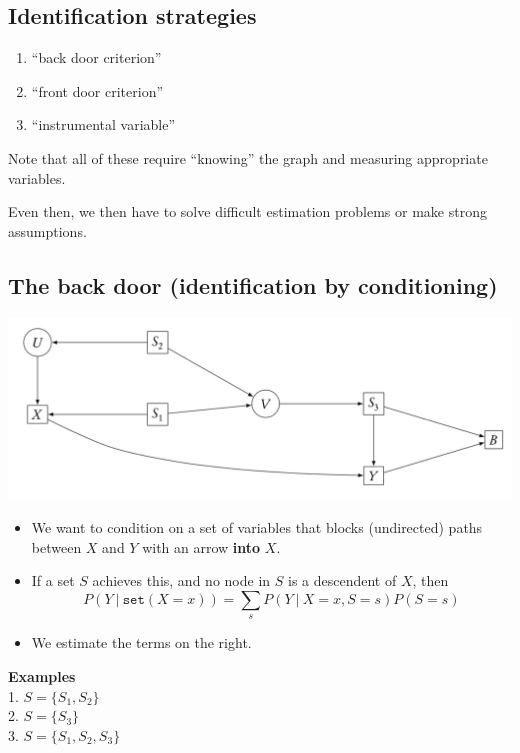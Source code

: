 \documentclass[]{article}
\providecommand{\tightlist}{%
  \setlength{\itemsep}{0pt}\setlength{\parskip}{0pt}}
\begin{document}
\hypertarget{identification-strategies}{%
\subsection{Identification strategies}\label{identification-strategies}}

\begin{enumerate}
\def\labelenumi{\arabic{enumi}.}
\tightlist
\item
  ``back door criterion''
\item
  ``front door criterion''
\item
  ``instrumental variable''
\end{enumerate}

Note that all of these require ``knowing'' the graph and measuring
appropriate variables.

Even then, we then have to solve difficult estimation problems or make
strong assumptions.

\hypertarget{the-back-door-identification-by-conditioning}{%
\subsection{The back door (identification by
conditioning)}\label{the-back-door-identification-by-conditioning}}

\begin{center}\includegraphics[width=0.5\linewidth]{gfx/back-door} \end{center}

\begin{itemize}
\item
  We want to condition on a set of variables that blocks (undirected)
  paths between \(X\) and \(Y\) with an arrow \textbf{into} \(X\).
\item
  If a set \(S\) achieves this, and no node in \(S\) is a descendent of
  \(X\), then \[
  P(Y\ \vert\ \texttt{set}(X=x)) = \sum_s P(Y\ \vert\ X=x, S=s)P(S=s)
  \]
\item
  We estimate the terms on the right.
\end{itemize}

\textbf{Examples}\\
1. \(S=\{S_1,S_2\}\)\\
2. \(S=\{S_3\}\)\\
3. \(S=\{S_1,S_2,S_3\}\)
\end{document}
